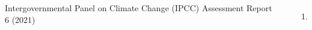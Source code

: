 

\begin{frame}
  \begin{small}
              
  \begin{columns}
  {\cb Intergovernmental Panel on Climate Change (IPCC) Assessment Report 6 (2021)}
    \begin{itemize}\setlength\itemsep{1.0ex}\footnotesize
      \item[1.]  
    \end{itemize}
  \end{columns}

  \end{small}
\end{frame}  

